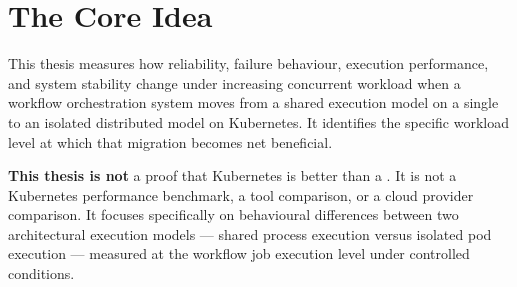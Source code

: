 \section{The Core Idea}

This thesis measures how reliability, failure behaviour, execution performance, and system
stability change under increasing concurrent workload when a workflow orchestration system
moves from a shared execution model on a single \vm{} to an isolated distributed model on
Kubernetes. It identifies the specific workload level at which that migration becomes net
beneficial.

\textbf{This thesis is not} a proof that Kubernetes is better than a \vm{}. It is not a
Kubernetes performance benchmark, a tool comparison, or a cloud provider comparison. It
focuses specifically on behavioural differences between two architectural execution models
--- shared process execution versus isolated pod execution --- measured at the workflow job
execution level under controlled conditions.
